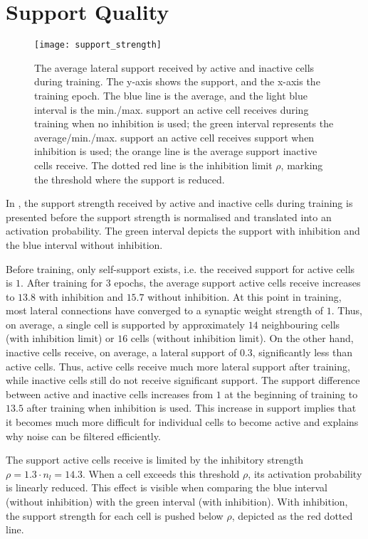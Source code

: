 \section{Support Quality}
%
\begin{figure}[h]
    \centering
    \texttt{[image: support\_strength]}
    \caption[Average lateral support]{The average lateral support received by active and inactive cells during training. The y-axis shows the support, and the x-axis the training epoch. The blue line is the average, and the light blue interval is the min./max. support an active cell receives during training when no inhibition is used; the green interval represents the average/min./max. support an active cell receives support when inhibition is used; the orange line is the average support inactive cells receive. The dotted red line is the inhibition limit $\rho$, marking the threshold where the support is reduced.}
\end{figure}
%
In , the support strength received by active and inactive cells during training is presented before the support strength is normalised and translated into an activation probability.
The green interval depicts the support with inhibition and the blue interval without inhibition.

Before training, only self-support exists, i.e. the received support for active cells is $1$.
After training for $3$ epochs, the average support active cells receive increases to $13.8$ with inhibition and $15.7$ without inhibition.
At this point in training, most lateral connections have converged to a synaptic weight strength of $1$.
Thus, on average, a single cell is supported by approximately $14$ neighbouring cells (with inhibition limit) or $16$ cells (without inhibition limit).
On the other hand, inactive cells receive, on average, a lateral support of $0.3$, significantly less than active cells.
Thus, active cells receive much more lateral support after training, while inactive cells still do not receive significant support.
The support difference between active and inactive cells increases from $1$ at the beginning of training to $13.5$ after training when inhibition is used.
This increase in support implies that it becomes much more difficult for individual cells to become active and explains why noise can be filtered efficiently.

The support active cells receive is limited by the inhibitory strength $\rho = 1.3\cdot n_l = 14.3$.
When a cell exceeds this threshold $\rho$, its activation probability is linearly reduced.
This effect is visible when comparing the blue interval (without inhibition) with the green interval (with inhibition). With inhibition, the support strength for each cell is pushed below $\rho$, depicted as the red dotted line.

